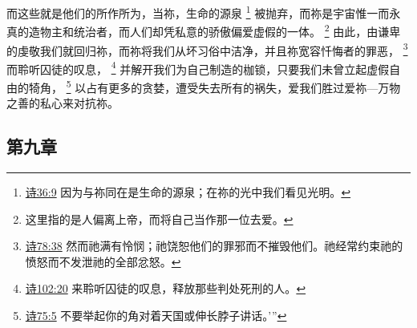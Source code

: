 \documentclass[12pt, a4paper, oneside]{ctexart}
\begin{document}
    而这些就是他们的所作所为，当祢，生命的源泉
    \footnote {
		\href{https://biblehub.com/psalms/36-9.htm}{诗36:9} 因为与祢同在是生命的源泉；在祢的光中我们看见光明。
	}
    被抛弃，而祢是宇宙惟一而永真的造物主和统治者，而人们却凭私意的骄傲偏爱虚假的一体。
    \footnote {
		这里指的是人偏离上帝，而将自己当作那一位去爱。
	}
    由此，由谦卑的虔敬我们就回归祢，而祢将我们从坏习俗中洁净，并且祢宽容忏悔者的罪恶，
    \footnote {
		\href{https://biblehub.com/psalms/78-38.htm}{诗78:38} 然而祂满有怜悯；祂饶恕他们的罪邪而不摧毁他们。祂经常约束祂的愤怒而不发泄祂的全部忿怒。
	}
    而聆听囚徒的叹息，
    \footnote {
		\href{https://biblehub.com/psalms/102-20.htm}{诗102:20} 来聆听囚徒的叹息，释放那些判处死刑的人。
	}
    并解开我们为自己制造的枷锁，只要我们未曾立起虚假自由的犄角，
    \footnote {
		\href{https://biblehub.com/psalms/75-5.htm}{诗75:5} 不要举起你的角对着天国或伸长脖子讲话。’”
	}
    以占有更多的贪婪，遭受失去所有的祸失，爱我们胜过爱祢---万物之善的私心来对抗祢。

\subsection{第九章}
\end{document}
